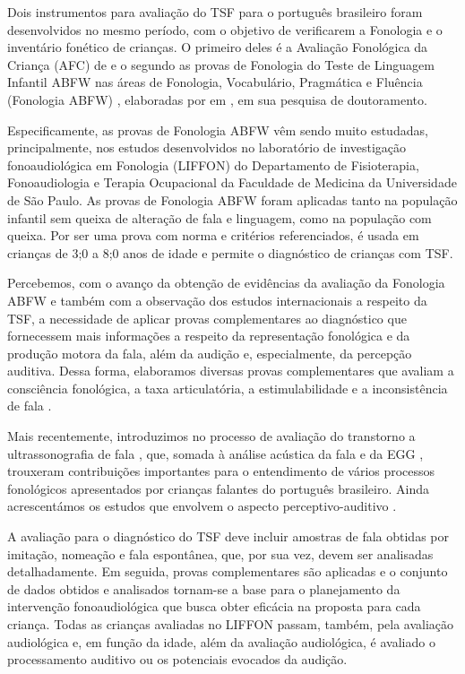 \documentclass[output=paper,colorlinks,citecolor=brown,booklanguage=portuguese]{langscibook}
\begin{document}
Dois instrumentos para avaliação do TSF para o português brasileiro foram desenvolvidos no mesmo período, com o objetivo de verificarem a Fonologia e o inventário fonético de crianças. O primeiro deles é a Avaliação Fonológica da Criança (AFC) de \citet{Yavas1991} e o segundo as provas de Fonologia do Teste de Linguagem Infantil ABFW nas áreas de Fonologia, Vocabulário, Pragmática e Fluência (Fonologia ABFW) \citep{Wertzner2004}, elaboradas por \citeauthor{Wertzner1992} em \citeyear{Wertzner1992}, em sua pesquisa de doutoramento.

Especificamente, as provas de Fonologia ABFW \citet{Wertzner1992,Wertzner2004} vêm sendo muito estudadas, principalmente, nos estudos desenvolvidos no laboratório de investigação fonoaudiológica em Fonologia (LIFFON) do Departamento de Fisioterapia, Fonoaudiologia e Terapia Ocupacional da Faculdade de Medicina da Universidade de São Paulo. As provas de Fonologia ABFW foram aplicadas tanto na população infantil sem queixa de alteração de fala e linguagem, como na população com queixa. Por ser uma prova com norma e critérios referenciados, é usada em crianças de 3;0 a 8;0 anos de idade e permite o diagnóstico de crianças com TSF. 

Percebemos, com o avanço da obtenção de evidências da avaliação da Fonologia ABFW e também com a observação dos estudos internacionais a respeito da TSF, a necessidade de aplicar provas complementares ao diagnóstico que fornecessem mais informações a respeito da representação fonológica e da produção motora da fala, além da audição e, especialmente, da percepção auditiva. Dessa forma, elaboramos diversas provas complementares que avaliam a consciência fonológica, a taxa articulatória, a estimulabilidade e a inconsistência de fala \citep{Castro2009, Wertzner2009, Castro2011, Wertzner2012}. 

Mais recentemente, introduzimos no processo de avaliação do transtorno a ultrassonografia de fala \citep{Francisco2017}, que, somada à análise acústica da fala e da EGG \citep{PaganNeves2007, PaganNeves2010}, trouxeram contribuições importantes para o entendimento de vários processos fonológicos apresentados por crianças falantes do português brasileiro. Ainda acrescentámos os estudos que envolvem o aspecto perceptivo-auditivo \citep{Goncalves2011, Barrozo2015}.

A avaliação para o diagnóstico do TSF deve incluir amostras de fala obtidas por imitação, nomeação e fala espontânea, que, por sua vez, devem ser analisadas detalhadamente. Em seguida, provas complementares são aplicadas e o conjunto de dados obtidos e analisados tornam-se a base para o planejamento da intervenção fonoaudiológica que busca obter eficácia na proposta para cada criança. Todas as crianças avaliadas no LIFFON passam, também, pela avaliação audiológica e, em função da idade, além da avaliação audiológica, é avaliado o processamento auditivo ou os potenciais evocados da audição.
\end{document}
